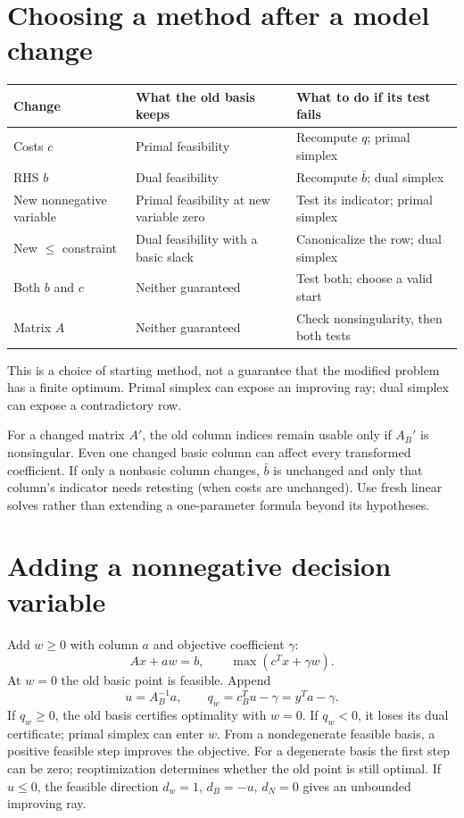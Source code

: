 \documentclass[11pt,a4paper]{article}
\begin{document}
\section{Choosing a method after a model change}\label{sec:methods}
\begin{center}
  \begin{tabular}{>{\raggedright\arraybackslash}p{3.4cm}>{\raggedright\arraybackslash}p{4.6cm}>{\raggedright\arraybackslash}p{5.1cm}}
    \toprule
    Change & What the old basis keeps & What to do if its test fails\\\midrule
    Costs $c$ & Primal feasibility & Recompute $q$; primal simplex\\
    RHS $b$ & Dual feasibility & Recompute $\bar b$; dual simplex\\
    New nonnegative variable & Primal feasibility at new variable zero & Test its indicator; primal simplex\\
    New $\leq$ constraint & Dual feasibility with a basic slack & Canonicalize the row; dual simplex\\
    Both $b$ and $c$ & Neither guaranteed & Test both; choose a valid start\\
    Matrix $A$ & Neither guaranteed & Check nonsingularity, then both tests\\\bottomrule
  \end{tabular}
\end{center}
This is a choice of starting method, not a guarantee that the modified problem
has a finite optimum. Primal simplex can expose an improving ray;
dual simplex can expose a contradictory row.

For a changed matrix $A'$, the old column indices remain usable only if $A_B'$
is nonsingular. Even one changed basic column can affect every transformed
coefficient. If only a nonbasic column changes, $\bar b$ is unchanged and
only that column's indicator needs retesting (when costs are unchanged).
Use fresh linear solves rather than extending a one-parameter formula beyond
its hypotheses.

\section{Adding a nonnegative decision variable}\label{sec:new-variable}
Add $w\geq0$ with column $a$ and objective coefficient $\gamma$:
\[
  Ax+aw=b,\qquad \max(c^Tx+\gamma w).
\]
At $w=0$ the old basic point is feasible. Append
\begin{equation}\label{eq:new-column}
  u=A_B^{-1}a,\qquad q_w=c_B^Tu-\gamma=y^Ta-\gamma.
\end{equation}
If $q_w\geq0$, the old basis certifies optimality with $w=0$.
If $q_w<0$, it loses its dual certificate; primal simplex can enter $w$.
From a nondegenerate feasible basis, a positive feasible step improves the
objective. For a degenerate basis the first step can be zero; reoptimization
determines whether the old point is still optimal.
If $u\leq0$, the feasible direction $d_w=1$, $d_B=-u$, $d_N=0$
gives an unbounded improving ray.
\end{document}
